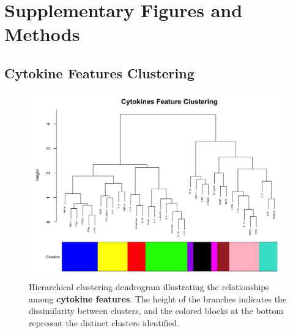 \documentclass[12pt,a4paper]{report}
\begin{document}
\appendix

\chapter{Supplementary Figures and Methods}
\label{chap:dendrograms_and_feature_interpretations}

\section{Cytokine Features Clustering}
\label{appendix:cytokine_features_clusterings}

\begin{figure}[H]
    \centering
    \includegraphics[width=\linewidth]{images/Cytokines_features_clustering_cut_colors.png}
    \caption[Cytokine features clustering dendrogram]{Hierarchical clustering dendrogram illustrating the relationships among \textbf{cytokine features}. The height of the branches indicates the dissimilarity between clusters, and the colored blocks at the bottom represent the distinct clusters identified.}
    \label{fig:Cytokines_features_clustering_cut_colors}
\end{figure}
\end{document}
